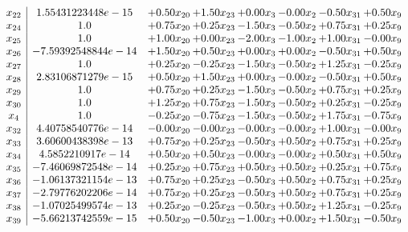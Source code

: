 \documentclass[8pt]{article}
\begin{document}
\[\begin{array}{c| c c@{\hskip 2pt} c@{\hskip 2pt} c@{\hskip 2pt} c@{\hskip 2pt} c@{\hskip 2pt} c@{\hskip 2pt} }
 x_{22}   &  1.55431223448e-15 & +  0.50 x_{20} & +  1.50 x_{23} & +  0.00 x_{3} & -0.00 x_{2} & -0.50 x_{31} & +  0.50 x_{9}\\
 x_{24}   &  1.0 & +  0.75 x_{20} & +  0.25 x_{23} & -1.50 x_{3} & -0.50 x_{2} & +  0.75 x_{31} & +  0.25 x_{9}\\
 x_{25}   &  1.0 & +  1.00 x_{20} & +  0.00 x_{23} & -2.00 x_{3} & -1.00 x_{2} & +  1.00 x_{31} & -0.00 x_{9}\\
 x_{26}   &  -7.59392548844e-14 & +  1.50 x_{20} & +  0.50 x_{23} & +  0.00 x_{3} & +  0.00 x_{2} & -0.50 x_{31} & +  0.50 x_{9}\\
 x_{27}   &  1.0 & +  0.25 x_{20} & -0.25 x_{23} & -1.50 x_{3} & -0.50 x_{2} & +  1.25 x_{31} & -0.25 x_{9}\\
 x_{28}   &  2.83106871279e-15 & +  0.50 x_{20} & +  1.50 x_{23} & +  0.00 x_{3} & -0.00 x_{2} & -0.50 x_{31} & +  0.50 x_{9}\\
 x_{29}   &  1.0 & +  0.75 x_{20} & +  0.25 x_{23} & -1.50 x_{3} & -0.50 x_{2} & +  0.75 x_{31} & +  0.25 x_{9}\\
 x_{30}   &  1.0 & +  1.25 x_{20} & +  0.75 x_{23} & -1.50 x_{3} & -0.50 x_{2} & +  0.25 x_{31} & -0.25 x_{9}\\
 x_{4}   &  1.0 & -0.25 x_{20} & -0.75 x_{23} & -1.50 x_{3} & -0.50 x_{2} & +  1.75 x_{31} & -0.75 x_{9}\\
 x_{32}   &  4.40758540776e-14 & -0.00 x_{20} & -0.00 x_{23} & -0.00 x_{3} & -0.00 x_{2} & +  1.00 x_{31} & -0.00 x_{9}\\
 x_{33}   &  3.60600438398e-13 & +  0.75 x_{20} & +  0.25 x_{23} & -0.50 x_{3} & +  0.50 x_{2} & +  0.75 x_{31} & +  0.25 x_{9}\\
 x_{34}   &  4.5852210917e-14 & +  0.50 x_{20} & +  0.50 x_{23} & -0.00 x_{3} & -0.00 x_{2} & +  0.50 x_{31} & +  0.50 x_{9}\\
 x_{35}   &  -7.46069872548e-14 & +  0.25 x_{20} & +  0.75 x_{23} & +  0.50 x_{3} & +  0.50 x_{2} & +  0.25 x_{31} & +  0.75 x_{9}\\
 x_{36}   &  -1.06137321154e-13 & +  0.75 x_{20} & +  0.25 x_{23} & -0.50 x_{3} & +  0.50 x_{2} & +  0.75 x_{31} & +  0.25 x_{9}\\
 x_{37}   &  -2.79776202206e-14 & +  0.75 x_{20} & +  0.25 x_{23} & -0.50 x_{3} & +  0.50 x_{2} & +  0.75 x_{31} & +  0.25 x_{9}\\
 x_{38}   &  -1.07025499574e-13 & +  0.25 x_{20} & -0.25 x_{23} & -0.50 x_{3} & +  0.50 x_{2} & +  1.25 x_{31} & -0.25 x_{9}\\
 x_{39}   &  -5.66213742559e-15 & +  0.50 x_{20} & -0.50 x_{23} & -1.00 x_{3} & +  0.00 x_{2} & +  1.50 x_{31} & -0.50 x_{9}\\

\end{array}\]
\end{document}
